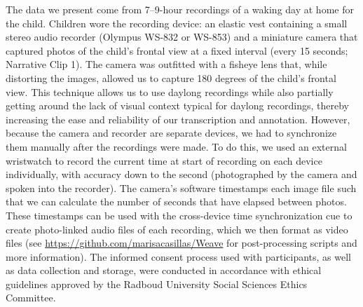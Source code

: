 \documentclass[,man,floatsintext]{apa6}
\begin{document}
The data we present come from 7--9-hour recordings of a waking day at
home for the child. Children wore the recording device: an elastic vest
containing a small stereo audio recorder (Olympus WS-832 or WS-853) and
a miniature camera that captured photos of the child's frontal view at a
fixed interval (every 15 seconds; Narrative Clip 1). The camera was
outfitted with a fisheye lens that, while distorting the images, allowed
us to capture 180 degrees of the child's frontal view. This technique
allows us to use daylong recordings while also partially getting around
the lack of visual context typical for daylong recordings, thereby
increasing the ease and reliability of our transcription and annotation.
However, because the camera and recorder are separate devices, we had to
synchronize them manually after the recordings were made. To do this, we
used an external wristwatch to record the current time at start of
recording on each device individually, with accuracy down to the second
(photographed by the camera and spoken into the recorder). The camera's
software timestamps each image file such that we can calculate the
number of seconds that have elapsed between photos. These timestamps can
be used with the cross-device time synchronization cue to create
photo-linked audio files of each recording, which we then format as
video files (see \url{https://github.com/marisacasillas/Weave} for
post-processing scripts and more information). The informed consent
process used with participants, as well as data collection and storage,
were conducted in accordance with ethical guidelines approved by the
Radboud University Social Sciences Ethics Committee.
\end{document}
